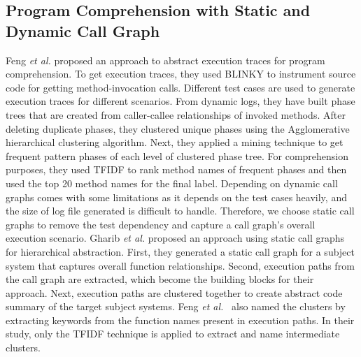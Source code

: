 \subsection{Program Comprehension with Static and Dynamic Call Graph }
Feng \textit{et al.} \cite{feng2018hierarchicalExecutionComprehension} proposed an approach to abstract execution traces for program comprehension. To get execution traces, they used BLINKY to instrument source code for getting method-invocation calls. Different test cases are used to generate execution traces for different scenarios. From dynamic logs, they have built phase trees that are created from caller-callee relationships of invoked methods. After deleting duplicate phases, they clustered unique phases using the Agglomerative hierarchical clustering algorithm. Next, they applied a mining technique to get frequent pattern phases of each level of clustered phase tree. For comprehension purposes, they used TFIDF to rank method names of frequent phases and then used the top 20 method names for the final label. Depending on dynamic call graphs comes with some limitations as it depends on the test cases heavily, and the size of log file generated is difficult to handle. Therefore, we choose static call graphs to remove the test dependency and capture a call graph's overall execution scenario. Gharib \textit{et al.}  \cite{gharibi2018automaticStaticCluster} proposed an approach using static call graphs for hierarchical abstraction. First, they generated a static call graph for a subject system that captures overall function relationships. Second, execution paths from the call graph are extracted, which become the building blocks for their approach. Next, execution paths are clustered together to create abstract code summary of the target subject systems. Feng \textit{et al.}~\cite{feng2018hierarchicalExecutionComprehension} also named the clusters by extracting keywords from the function names present in execution paths. In their study, only the TFIDF technique is applied to extract and name intermediate clusters.

